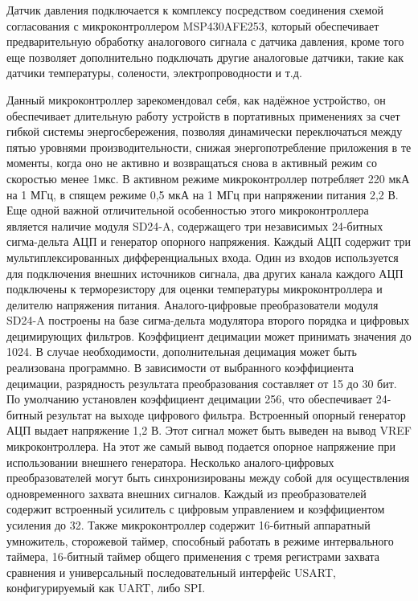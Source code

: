 Датчик давления подключается к комплексу посредством соединения схемой согласования с микроконтроллером MSP430AFE253, который обеспечивает предварительную обработку аналогового сигнала с датчика давления, кроме того еще позволяет дополнительно подключать другие аналоговые датчики, такие как датчики температуры, солености, электропроводности и т.д.

Данный микроконтроллер зарекомендовал себя, как надёжное устройство, он обеспечивает длительную работу устройств в портативных применениях за счет гибкой системы энергосбережения, позволяя динамически переключаться между пятью уровнями производительности, снижая энергопотребление приложения в те моменты, когда оно не активно и возвращаться снова в активный режим со скоростью менее 1мкс. В активном режиме микроконтроллер потребляет 220 мкА на 1 МГц, в спящем режиме 0,5 мкА на 1 МГц при напряжении питания 2,2 В. Еще одной важной отличительной особенностью этого микроконтроллера является наличие модуля SD24-A, содержащего три независимых 24-битных сигма-дельта АЦП и генератор опорного напряжения. Каждый АЦП содержит три мультиплексированных дифференциальных входа. Один из входов используется для подключения внешних источников сигнала, два других канала каждого АЦП подключены к терморезистору для оценки температуры микроконтроллера и делителю напряжения питания. Аналого-цифровые преобразователи модуля SD24-A построены на базе сигма-дельта модулятора второго порядка и цифровых децимирующих фильтров. Коэффициент децимации может принимать значения до 1024. В случае необходимости, дополнительная децимация может быть реализована программно. В зависимости от выбранного коэффициента децимации, разрядность результата преобразования составляет от 15 до 30 бит. По умолчанию установлен коэффициент децимации 256, что обеспечивает 24-битный результат на выходе цифрового фильтра. Встроенный опорный генератор АЦП выдает напряжение 1,2 В. Этот сигнал может быть выведен на вывод VREF микроконтроллера. На этот же самый вывод подается опорное напряжение при использовании внешнего генератора. Несколько аналого-цифровых преобразователей могут быть синхронизированы между собой для осуществления одновременного захвата внешних сигналов. Каждый из преобразователей содержит встроенный усилитель с цифровым управлением и коэффициентом усиления до 32. Также микроконтроллер содержит 16-битный аппаратный умножитель, сторожевой таймер, способный работать в режиме интервального таймера, 16-битный таймер общего применения с тремя регистрами захвата сравнения и универсальный последовательный интерфейс USART, конфигурируемый как UART, либо SPI.

